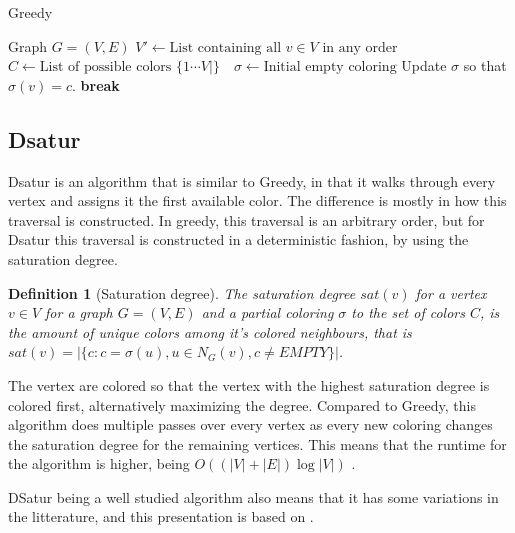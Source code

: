 \documentclass{amsart}
\newtheorem{definition}{Definition}[section]
\newcommand{\algorithmicbreak}{\textbf{break}}
\newcommand{\BREAK}{\STATE \algorithmicbreak}
\begin{document}
\begin{algorithm}[H]
  \caption{Greedy}
  \label{alg:greedy}
  \begin{algorithmic}[1]
      \REQUIRE Graph $G = (V,E)$
      \STATE $V' \leftarrow \text{List containing all $v \in V$ in any order}$
      \STATE $C \leftarrow \text{List of possible colors $\{1 \cdots V| \}$ }$
      \STATE $\sigma \leftarrow \text{Initial empty coloring}$
                \STATE Update $\sigma$ so that $\sigma(v) = c$.
                \BREAK
            \ENDIF
        \ENDFOR
    \ENDFOR
  \end{algorithmic}
\end{algorithm}
\subsection{Dsatur}

Dsatur is an algorithm that is similar to Greedy, in that it walks through every
vertex and assigns it the first available color. The difference is mostly in
how this traversal is constructed. In greedy, this traversal is an arbitrary
order, but for Dsatur this traversal is constructed in a deterministic fashion,
by using the saturation degree.

\begin{definition}[Saturation degree]
    The saturation degree $sat(v)$ for a vertex $v \in V$ for a graph $G =
    (V,E)$ and a partial coloring $\sigma$ to the set of colors $C$, is the amount of unique colors among
    it's colored neighbours, that is $sat(v) = |\{c  : c = \sigma(u), u \in N_G(v),c \neq EMPTY  \}|$.
\end{definition}

The vertex are colored so that the vertex with the highest saturation degree is
colored first, alternatively maximizing the degree. Compared to Greedy, this
algorithm does multiple passes over every vertex as every new coloring changes
the saturation degree for the remaining vertices. This means that the runtime
for the algorithm is higher, being
$O((|V|+|E|)\log{|V|})$ \cite{Constructive}.

DSatur being a well studied algorithm also means that it has some variations in 
the litterature, and this presentation is based on \cite{Constructive}.
\end{document}
